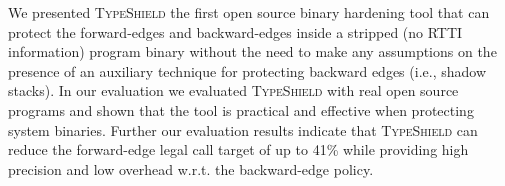 
We presented \textsc{TypeShield} the first open source binary 
hardening tool that can protect the forward-edges and backward-edges 
inside a stripped (no RTTI information) program binary without the need to make any assumptions
on the presence of an auxiliary technique for protecting backward edges (i.e., shadow stacks). 
In our evaluation we evaluated
\textsc{TypeShield} with real open source programs and shown that the 
tool is practical and effective when protecting system binaries.
Further our evaluation results indicate that \textsc{TypeShield} can reduce the forward-edge legal 
call target of up to 41\% while providing high precision and low overhead
w.r.t. the backward-edge policy.


